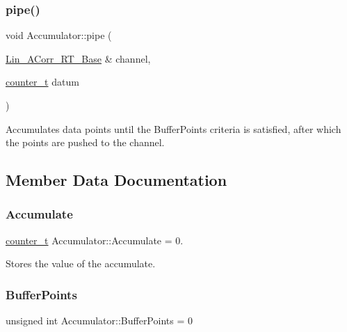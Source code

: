 \subsubsection{\texorpdfstring{pipe()}{pipe()}}
{\footnotesize\ttfamily void Accumulator\+::pipe (\begin{DoxyParamCaption}\item[{\hyperlink{classLin__ACorr__RT__Base}{Lin\+\_\+\+A\+Corr\+\_\+\+R\+T\+\_\+\+Base} \&}]{channel,  }\item[{\hyperlink{types_8hpp_ac89ac912f524b3e3fa3720ea55fec966}{counter\+\_\+t}}]{datum }\end{DoxyParamCaption})\hspace{0.3cm}{\ttfamily [inline]}}



Accumulates data points until the Buffer\+Points criteria is satisfied, after which the points are pushed to the channel. 



\subsection{Member Data Documentation}
\mbox{\label{classAccumulator_a8e615af8b85dd2c8500d1f8c473879ab}} 
\subsubsection{\texorpdfstring{Accumulate}{Accumulate}}
{\footnotesize\ttfamily \hyperlink{types_8hpp_ac89ac912f524b3e3fa3720ea55fec966}{counter\+\_\+t} Accumulator\+::\+Accumulate = 0.\hspace{0.3cm}{\ttfamily [private]}}



Stores the value of the accumulate. 

\mbox{\label{classAccumulator_a559e4fac031df015e47248599740b33c}} 
\subsubsection{\texorpdfstring{Buffer\+Points}{BufferPoints}}
{\footnotesize\ttfamily unsigned int Accumulator\+::\+Buffer\+Points = 0\hspace{0.3cm}{\ttfamily [private]}}



